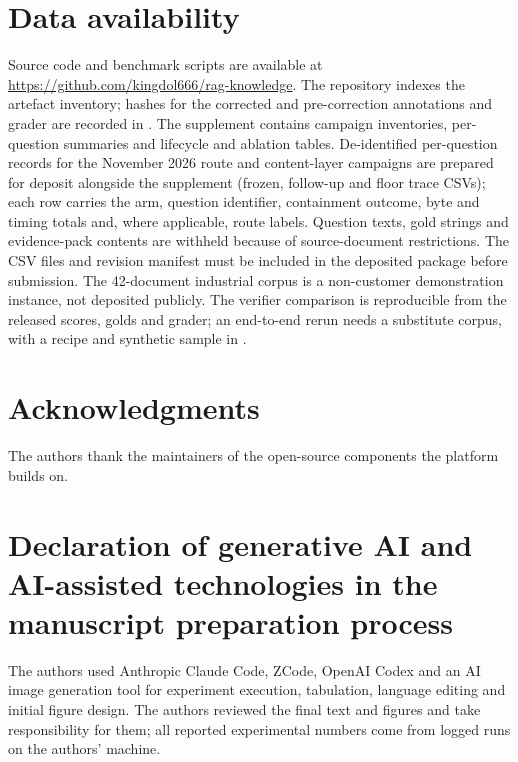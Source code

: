 \documentclass[11pt]{article}
\begin{document}
\section*{Data availability}
Source code and benchmark scripts are available at
\url{https://github.com/kingdol666/rag-knowledge}. The repository indexes the
artefact inventory; hashes for the corrected and pre-correction annotations
and grader are recorded in
.
The supplement contains campaign inventories, per-question summaries and
lifecycle and ablation tables. De-identified per-question records for the
November 2026 route and content-layer campaigns are prepared for deposit
alongside the supplement (frozen, follow-up and floor trace CSVs); each row
carries the arm, question identifier, containment outcome, byte and timing
totals and, where applicable, route labels. Question texts, gold strings and
evidence-pack contents are withheld because of source-document restrictions.
The CSV files and revision manifest must be included in the deposited package
before submission.
The 42-document industrial corpus is a non-customer demonstration instance,
not deposited publicly. The verifier comparison is reproducible from the
released scores, golds and grader; an end-to-end rerun needs a substitute
corpus, with a recipe and synthetic sample in
.

\section*{Acknowledgments}
The authors thank the maintainers of the open-source components the platform
builds on. %

\section*{Declaration of generative AI and AI-assisted technologies in the manuscript preparation process}
The authors used Anthropic Claude Code, ZCode, OpenAI Codex and an AI image
generation tool for experiment execution, tabulation, language editing and
initial figure design. The authors reviewed the final text and figures and take
responsibility for them; all reported experimental numbers come from logged
runs on the authors' machine.
\end{document}
